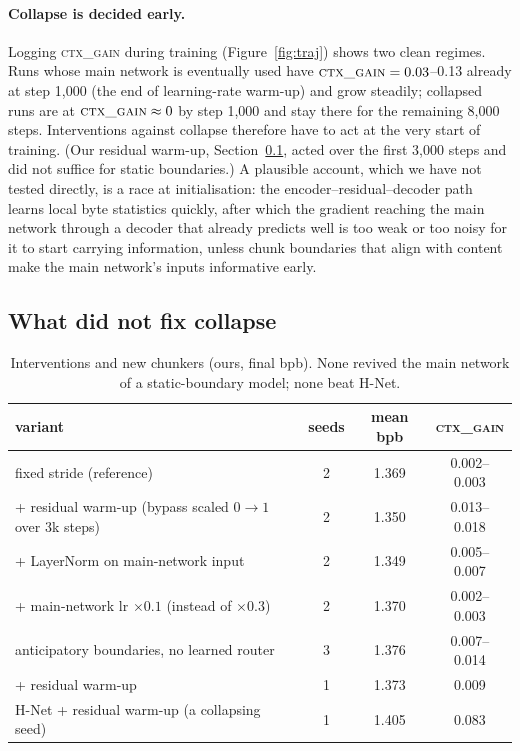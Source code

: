 \documentclass[10pt]{article}
\newcommand{\ctx}{\textsc{ctx\_gain}}
\newcommand{\bpb}{bpb}
\begin{document}
\paragraph{Collapse is decided early.} Logging \ctx{} during training (Figure~\ref{fig:traj})
shows two clean regimes. Runs whose main network is eventually used have $\ctx{}=0.03$--0.13 already
at step 1{,}000 (the end of learning-rate warm-up) and grow steadily; collapsed runs are at
$\ctx{}\approx0$ by step 1{,}000 and stay there for the remaining 8{,}000 steps. Interventions
against collapse therefore have to act at the very start of training. (Our residual warm-up,
Section~\ref{sec:negative}, acted over the first 3{,}000 steps and did not suffice for static
boundaries.) A plausible account, which we have not tested directly, is a race at initialisation:
the encoder--residual--decoder path learns local byte statistics quickly, after which the gradient
reaching the main network through a decoder that already predicts well is too weak or too noisy for
it to start carrying information, unless chunk boundaries that align with content make the main
network's inputs informative early.

\subsection{What did not fix collapse}
\label{sec:negative}

\begin{table}[t]
\centering
\small
\caption{Interventions and new chunkers (ours, final \bpb{}). None revived the main network of a
static-boundary model; none beat H-Net.}
\label{tab:negative}
\begin{tabular}{lccc}
\toprule
variant & seeds & mean \bpb{} & \ctx{}\\
\midrule
fixed stride (reference) & 2 & 1.369 & 0.002--0.003\\
\quad + residual warm-up (bypass scaled $0\to1$ over 3k steps) & 2 & 1.350 & 0.013--0.018\\
\quad + LayerNorm on main-network input & 2 & 1.349 & 0.005--0.007\\
\quad + main-network lr $\times0.1$ (instead of $\times0.3$) & 2 & 1.370 & 0.002--0.003\\
anticipatory boundaries, no learned router & 3 & 1.376 & 0.007--0.014\\
\quad + residual warm-up & 1 & 1.373 & 0.009\\
H-Net + residual warm-up (a collapsing seed) & 1 & 1.405 & 0.083\\
\bottomrule
\end{tabular}
\end{table}
\end{document}

